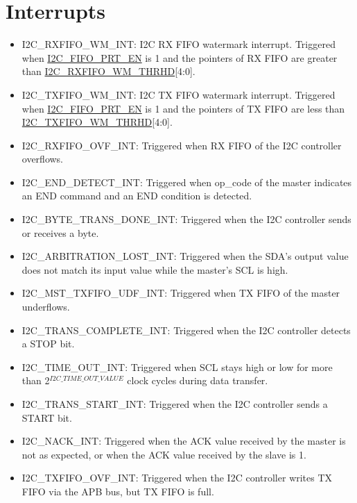 \documentclass[main\_\_EN.tex]{subfiles}
\begin{document}
\section{Interrupts}\label{sub:i2c-int}
\begin{itemize}
    \item \label{int:i2c-rxfifo-wm}I2C\_RXFIFO\_WM\_INT: I2C RX FIFO watermark interrupt. Triggered when \hyperref[fielddesc:I2CFIFOPRTEN]{I2C\_FIFO\_PRT\_EN} is 1 and the pointers of RX FIFO are greater than \hyperref[fielddesc:I2CRXFIFOWMTHRHD]{I2C\_RXFIFO\_WM\_THRHD}[4:0].
    \item \label{int:i2c-txfifo-wm}I2C\_TXFIFO\_WM\_INT: I2C TX FIFO watermark interrupt. Triggered when \hyperref[fielddesc:I2CFIFOPRTEN]{I2C\_FIFO\_PRT\_EN} is 1 and the pointers of TX FIFO are less than \hyperref[fielddesc:I2CTXFIFOWMTHRHD]{I2C\_TXFIFO\_WM\_THRHD}[4:0].
    \item \label{int:i2c-rxfifo-ovf}I2C\_RXFIFO\_OVF\_INT: Triggered when RX FIFO of the I2C controller overflows.
    \item \label{int:i2c-end}I2C\_END\_DETECT\_INT: Triggered when op\_code of the master indicates an END command and an END condition is detected.
    \item \label{int:i2c-byte-trans-done}I2C\_BYTE\_TRANS\_DONE\_INT: Triggered when the I2C controller sends or receives a byte.
    \item \label{int:i2c-arbitration-lost}I2C\_ARBITRATION\_LOST\_INT: Triggered when the SDA's output value does not match its input value while the master's SCL is high.
    \item \label{int:i2c-mst-txfifo-udf}I2C\_MST\_TXFIFO\_UDF\_INT: Triggered when TX FIFO of the master underflows.
    \item \label{int:i2c-trans-complete}I2C\_TRANS\_COMPLETE\_INT: Triggered when the I2C controller detects a STOP bit.
    \item \label{int:i2c-time-out}I2C\_TIME\_OUT\_INT: Triggered when SCL stays high or low for more than 2$^{\hyperref[fielddesc:I2CTIMEOUTVALUE]{I2C\_TIME\_OUT\_VALUE}}$ clock cycles during data transfer.
    \item \label{int:i2c-trans-start}I2C\_TRANS\_START\_INT: Triggered when the I2C controller sends a START bit.
    \item \label{int:i2c-nack}I2C\_NACK\_INT: Triggered when the ACK value received by the master is not as expected, or when the ACK value received by the slave is 1.
    \item \label{int:i2c-txfifo-ovf}I2C\_TXFIFO\_OVF\_INT: Triggered when the I2C controller writes TX FIFO via the APB bus, but TX FIFO is full.

\end{itemize}
\end{document}
